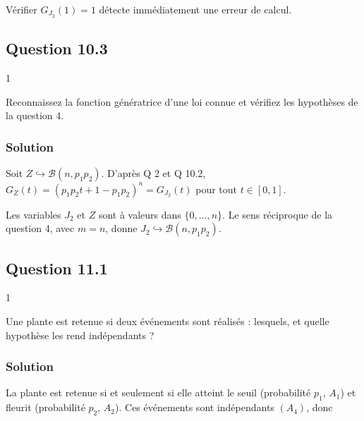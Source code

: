 \documentclass[11pt,a4paper]{article}
\begin{document}
\begin{methode}

Vérifier \(G_{J_2}(1)=1\) détecte immédiatement une erreur de calcul.

\end{methode}

\hypertarget{question-10.3}{%
\subsection{Question 10.3}\label{question-10.3}}

\begin{indication}{1}

Reconnaissez la fonction génératrice d'une loi connue et vérifiez les hypothèses de la question 4.

\end{indication}

\hypertarget{solution-22}{%
\subsubsection{Solution}\label{solution-22}}

Soit \(Z\hookrightarrow\mathcal B(n,p_1p_2)\). D'après Q 2 et Q 10.2, \(G_Z(t)=(p_1p_2t+1-p_1p_2)^n=G_{J_2}(t)\) pour tout \(t\in[0,1]\).

Les variables \(J_2\) et \(Z\) sont à valeurs dans \(\{0,\dots,n\}\). Le sens réciproque de la question 4, avec \(m=n\), donne \textbf{\(J_2\hookrightarrow\mathcal B(n,p_1p_2)\)}.

\hypertarget{question-11.1}{%
\subsection{Question 11.1}\label{question-11.1}}

\begin{indication}{1}

Une plante est retenue si deux événements sont réalisés : lesquels, et quelle hypothèse les rend indépendants ?

\end{indication}

\hypertarget{solution-23}{%
\subsubsection{Solution}\label{solution-23}}

La plante est retenue si et seulement si elle atteint le seuil (probabilité \(p_1\), \(A_1\)) et fleurit (probabilité \(p_2\), \(A_2\)). Ces événements sont indépendants \((A_4)\), donc
\end{document}
